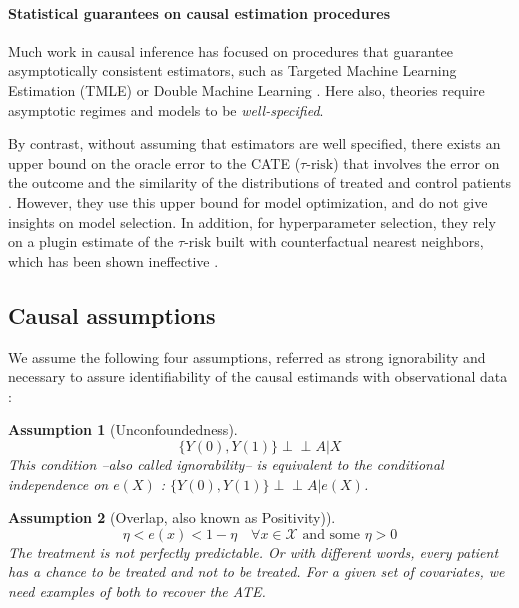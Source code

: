 \documentclass[a4paper,num-refs]{oup-contemporary}%
\newtheorem{assumption}{Assumption}
\newcommand{\indep}{\perp \!\!\! \perp}
\begin{document}
\paragraph{Statistical guarantees on causal estimation procedures}

Much work in causal inference has focused on procedures that
guarantee asymptotically consistent estimators, such as Targeted
Machine Learning
Estimation (TMLE) \cite{laan_targeted_2011,schuler_targeted_2017} or
Double Machine Learning \cite{chernozhukov_double_2018}. Here also, theories require asymptotic regimes and
models to be \textit{well-specified}.

By contrast, without assuming that estimators are well specified, there exists an upper bound
on the oracle error to the CATE ($\tau\text{-risk}$) that involves the error on
the outcome and the similarity of the distributions of treated and control
patients \cite{johansson2022generalization}. However, they use this upper bound for model optimization,
and do not give insights on model selection. In addition, for hyperparameter
selection, they rely on a plugin estimate of the $\tau\text{-risk}$ built with
counterfactual nearest neighbors, which has been shown ineffective
\cite{schuler_comparison_2018}.


\subsection{Causal assumptions}\label{apd:causal_assumptions}

We assume the following four assumptions, referred as strong ignorability and
necessary to assure identifiability of the causal estimands with observational
data \cite{rubin_causal_2005}:
\begin{assumption}[Unconfoundedness]\label{assumption:ignorability}
    \begin{equation*}\label{eq:ignorability}
        \{Y(0), Y(1) \} \indep A | X
    \end{equation*}
    This condition --also called ignorability-- is equivalent to the conditional
    independence on $e(X)$ \cite{rosenbaum_central_1983}: $\{Y(0), Y(1) \}
        \indep  A | e(X)$.
\end{assumption}


\begin{assumption}[Overlap, also known as Positivity)]\label{assumption:overlap}
    \begin{equation*}\label{eq:overlap}
        \eta < e(x) < 1 - \eta \quad \forall x \in \mathcal X \text{ and some } \eta > 0
    \end{equation*}
    The treatment is not perfectly predictable. Or with different words, every
    patient has a chance to be treated and not to be treated. For a given set of
    covariates, we need examples of both to recover the ATE.
\end{assumption}
\end{document}
